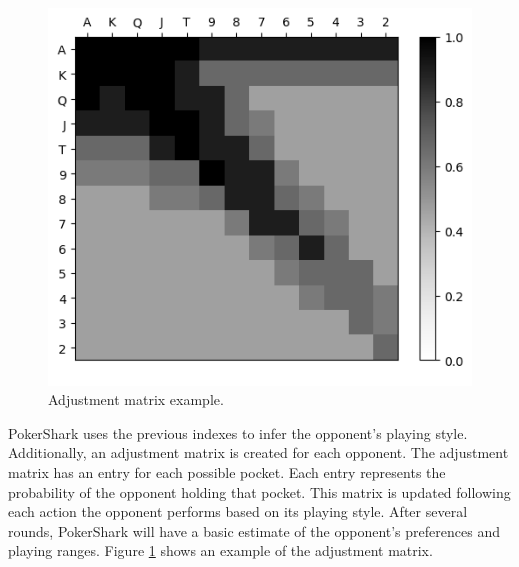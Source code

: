 \begin{figure}[h]
    \centering
    \includegraphics[width=\textwidth/2]{graphics/weights.png}
    \caption{Adjustment matrix example.}
    \label{fig:matrix}
\end{figure}

PokerShark uses the previous indexes to infer the opponent's playing style. Additionally, an adjustment matrix is created for each opponent. The adjustment matrix has an entry for each possible pocket. Each entry represents the probability of the opponent holding that pocket. This matrix is updated following each action the opponent performs based on its playing style. After several rounds, PokerShark will have a basic estimate of the opponent's preferences and playing ranges. Figure \ref{fig:matrix} shows an example of the adjustment matrix.



